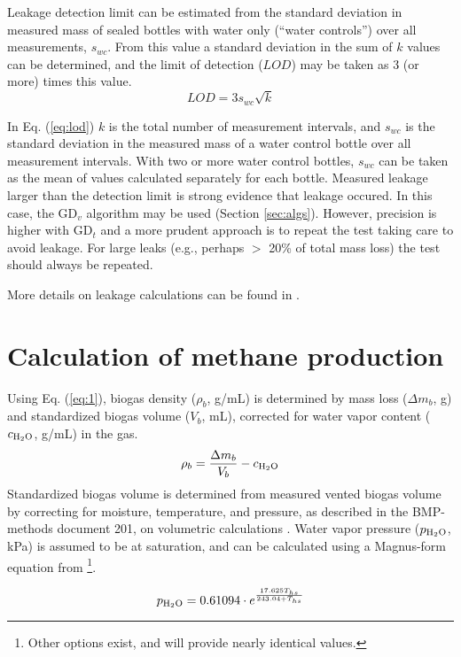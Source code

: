 \documentclass[]{article}
\begin{document}
Leakage detection limit can be estimated from the standard deviation in measured mass of sealed bottles with water only (``water controls'') over all measurements, $s_{wc}$. 
From this value a standard deviation in the sum of $k$ values can be determined, and the limit of detection ($LOD$) may be taken as 3 (or more) times this value.
\begin{equation}
  \label{eq:lod}
  LOD = 3 s_{wc} \sqrt{k}
\end{equation}

In Eq. (\ref{eq:lod}) $k$ is the total number of measurement intervals, and $s_{wc}$ is the standard deviation in the measured mass of a water control bottle over all measurement intervals. 
With two or more water control bottles, $s_{wc}$ can be taken as the mean of values calculated separately for each bottle.
Measured leakage larger than the detection limit is strong evidence that leakage occured. 
In this case, the GD$_v$ algorithm may be used (Section \ref{sec:algs}).
However, precision is higher with GD$_t$ and a more prudent approach is to repeat the test taking care to avoid leakage.
For large leaks (e.g., perhaps $>$ 20\% of total mass loss) the test should always be repeated.

More details on leakage calculations can be found in \citet{hafnerQuantificationLeakageBatch2018}. 

\section{Calculation of methane production}
Using Eq. (\ref{eq:1}), biogas density ($\rho_b$, g/mL) is determined by mass loss ($\Delta m_b$, g) and standardized biogas volume ($V_b$, mL), corrected for water vapor content ($c\textsubscript{H$_2$O}$, g/mL) in the gas. 
\begin{equation}
  \label{eq:1}
  \rho_b=\frac{\Delta m_b}{V_b}-c\textsubscript{H$_2$O}
\end{equation}
Standardized biogas volume is determined from measured vented biogas volume by correcting for moisture, temperature, and pressure, as described in the BMP-methods document 201, on volumetric calculations \citep{BMPdoc201vol}.
Water vapor pressure ($p\textsubscript{H$_2$O}$, kPa) is assumed to be at saturation, and can be calculated using a Magnus-form equation from \citet{alduchovImprovedMagnusForm1996}\footnote{
  Other options exist, and will provide nearly identical values.
}.

\begin{equation}
\label{eq:2_magnus}
   p\textsubscript{H$_2$O} = 0.61094 \cdot e^{\frac{17.625 T_{hs}}{243.04 + T_{hs}}}
\end{equation}
\end{document}

